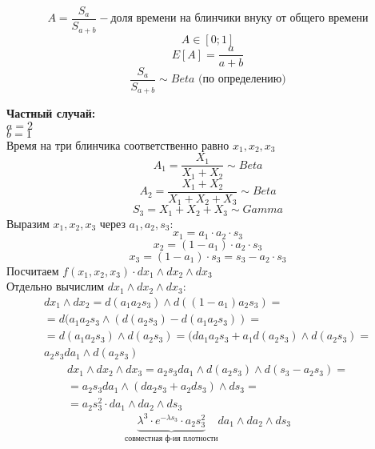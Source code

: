 \documentclass[12pt]{article} %
\theoremstyle{definition} %
\begin{document}
\begin{enumerate}
\begin{center}
\end{center}     
        \[
            A = \frac{S_a}{S_{a+b}} - \text{доля времени на блинчики внуку от общего времени}
        \]
        \[
            A \in [0;1]
        \]
        \[
            E[A] = \frac{a}{a+b}
        \]
        \[
             \frac{S_a}{S_{a+b}} \sim Beta \text{ (по определению)}
        \]
    \end{enumerate}
    \textbf{Частный случай:}\\
    $a = 2$  \\
    $b = 1$ \\
    Время на три блинчика соответственно равно $x_1, x_2, x_3$
    \[
        A_1 = \frac{X_1}{X_1 + X_2} \sim Beta
    \]
    \[
        A_2 = \frac{X_1 + X_2}{X_1 + X_2 + X_3} \sim Beta
    \]
    \[
        S_3 = X_1 + X_2 + X_3 \sim Gamma
    \]
    Выразим $x_1, x_2, x_3$ через $a_1, a_2, s_3$:
    \[
        x_1 = a_1 \cdot a_2 \cdot s_3
    \]
    \[
        x_2 = (1 - a_1) \cdot a_2 \cdot s_3
    \]
    \[
        x_3 = (1 - a_1) \cdot s_3 = s_3 - a_2 \cdot s_3
    \]
    Посчитаем $f(x_1, x_2, x_3) \cdot dx_1 \wedge dx_2 \wedge dx_3$ \\
    Отдельно вычислим $dx_1 \wedge dx_2 \wedge dx_3$:
    \begin{eqnarray*}
        dx_1 \wedge dx_2 = d(a_1 a_2 s_3) \wedge d((1 - a_1) a_2 s_3) = \\
        = d(a_1 a_2 s_3 \wedge (d(a_2 s_3) - d(a_1 a_2 s_3)) = \\
        =d(a_1 a_2 s_3) \wedge d(a_2 s_3) = (da_1 a_2 s_3 + a_1 d(a_2 s_3) \wedge d(a_2 s_3) = \\
        a_2 s_3 da_1 \wedge d(a_2 s_3)
    \end{eqnarray*}
    \begin{eqnarray*}
        dx_1 \wedge dx_2 \wedge dx_3 = a_2 s_3 da_1 \wedge d(a_2 s_3) \wedge d(s_3 - a_2 s_3) = \\
        = a_2 s_3 da_1 \wedge (da_2 s_3 + a_2 ds_3) \wedge ds_3 = \\
        = a_2 s_3^2 \cdot da_1 \wedge da_2 \wedge ds_3
    \end{eqnarray*}
    \[
        \underbrace{\lambda^3 \cdot e^{- \lambda s_3}\cdot a_2 s_3^2}_{\text{совместная ф-ия плотности}} da_1 \wedge da_2 \wedge ds_3
    \]
    
\end{document}
